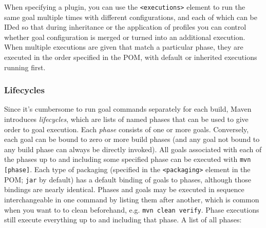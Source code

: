\documentclass[table, xcdraw]{article}%
\begin{document}
When specifying a plugin, you can use the \texttt{<executions>} element to run the same goal multiple times with different configurations, and each of which can be IDed so that during inheritance or the application of profiles you can control whether goal configuration is merged or turned into an additional execution. When multiple executions are given that match a particular phase, they are executed in the order specified in the POM, with default or inherited executions running first.

\subsubsection{Lifecycles}

Since it's cumbersome to run goal commands separately for each build, Maven introduces \emph{lifecycles}, which are lists of named phases that can be used to give order to goal execution. Each \emph{phase} consists of one or more goals. Conversely, each goal can be bound to zero or more build phases (and any goal not bound to any build phase can always be directly invoked). All goals associated with each of the phases up to and including some specified phase can be executed with \texttt{mvn [phase]}. Each type of packaging (specified in the \texttt{<packaging>} element in the POM; \texttt{jar} by default) has a default binding of goals to phases, although those bindings are nearly identical. Phases and goals may be executed in sequence interchangeable in one command by listing them after another, which is common when you want to to clean beforehand, e.g. \texttt{mvn clean verify}. Phase executions still execute everything up to and including that phase. A list of all phases:
\end{document}
